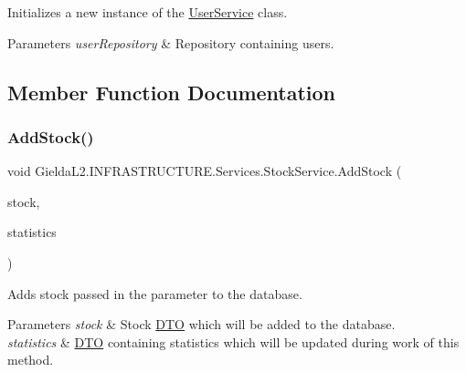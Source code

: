 Initializes a new instance of the \mbox{\hyperlink{class_gielda_l2_1_1_i_n_f_r_a_s_t_r_u_c_t_u_r_e_1_1_services_1_1_user_service}{User\+Service}} class. 


\begin{DoxyParams}{Parameters}
{\em user\+Repository} & Repository containing users.\\
\hline
\end{DoxyParams}


\subsection{Member Function Documentation}
\mbox{\label{class_gielda_l2_1_1_i_n_f_r_a_s_t_r_u_c_t_u_r_e_1_1_services_1_1_stock_service_a6d019e5819834d6f1636180026d11dab}} 
\subsubsection{\texorpdfstring{AddStock()}{AddStock()}}
{\footnotesize\ttfamily void Gielda\+L2.\+I\+N\+F\+R\+A\+S\+T\+R\+U\+C\+T\+U\+R\+E.\+Services.\+Stock\+Service.\+Add\+Stock (\begin{DoxyParamCaption}\item[{\mbox{\hyperlink{class_gielda_l2_1_1_i_n_f_r_a_s_t_r_u_c_t_u_r_e_1_1_d_t_o_1_1_stock_d_t_o}{Stock\+D\+TO}}}]{stock,  }\item[{\mbox{\hyperlink{class_gielda_l2_1_1_i_n_f_r_a_s_t_r_u_c_t_u_r_e_1_1_d_t_o_1_1_statistics_d_t_o}{Statistics\+D\+TO}}}]{statistics }\end{DoxyParamCaption})}



Adds stock passed in the parameter to the database. 


\begin{DoxyParams}{Parameters}
{\em stock} & Stock \mbox{\hyperlink{namespace_gielda_l2_1_1_i_n_f_r_a_s_t_r_u_c_t_u_r_e_1_1_d_t_o}{D\+TO}} which will be added to the database.\\
\hline
{\em statistics} & \mbox{\hyperlink{namespace_gielda_l2_1_1_i_n_f_r_a_s_t_r_u_c_t_u_r_e_1_1_d_t_o}{D\+TO}} containing statistics which will be updated during work of this method.\\
\hline
\end{DoxyParams}


